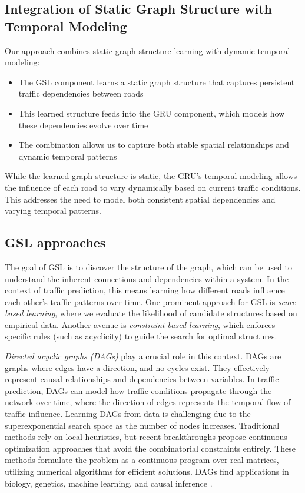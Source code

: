\documentclass[pdflatex,sn-mathphys-num]{sn-jnl}%
\theoremstyle{thmstyleone}%
\theoremstyle{thmstyletwo}%
\theoremstyle{thmstylethree}%
\begin{document}
\subsection{Integration of Static Graph Structure with Temporal Modeling}
Our approach combines static graph structure learning with dynamic temporal modeling:

\begin{itemize}
\item The GSL component learns a static graph structure that captures persistent traffic dependencies between roads
\item This learned structure feeds into the GRU component, which models how these dependencies evolve over time
\item The combination allows us to capture both stable spatial relationships and dynamic temporal patterns
\end{itemize}

While the learned graph structure is static, the GRU's temporal modeling allows the influence of each road to vary dynamically based on current traffic conditions. This addresses the need to model both consistent spatial dependencies and varying temporal patterns.

\subsection{GSL approaches}
The goal of GSL is to discover the structure of the graph, which can be used to understand the inherent connections and dependencies within a system. In the context of traffic prediction, this means learning how different roads influence each other's traffic patterns over time. One prominent approach for GSL is \textit{score-based learning}, where we evaluate the likelihood of candidate structures based on empirical data. Another avenue is \textit{constraint-based learning}, which enforces specific rules (such as acyclicity) to guide the search for optimal structures.

\textit{Directed acyclic graphs (DAGs)} play a crucial role in this context. DAGs are graphs where edges have a direction, and no cycles exist. They effectively represent causal relationships and dependencies between variables. In traffic prediction, DAGs can model how traffic conditions propagate through the network over time, where the direction of edges represents the temporal flow of traffic influence. Learning DAGs from data is challenging due to the superexponential search space as the number of nodes increases. Traditional methods rely on local heuristics, but recent breakthroughs propose continuous optimization approaches that avoid the combinatorial constraints entirely. These methods formulate the problem as a continuous program over real matrices, utilizing numerical algorithms for efficient solutions. DAGs find applications in biology, genetics, machine learning, and causal inference \citep{math12081198,zheng2018dags}.
\end{document}
